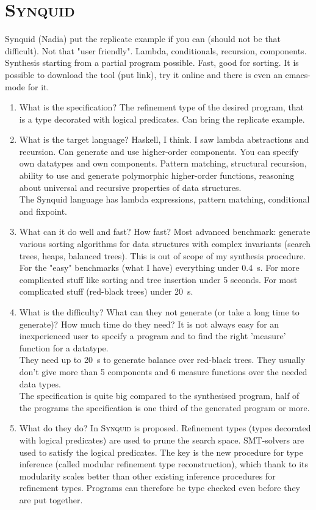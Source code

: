 \section{\textsc{Synquid}}
Synquid (Nadia) put the replicate example if you can (should not be that difficult). Not that "user friendly". Lambda, conditionals, recursion, components. Synthesis starting from a partial program possible. Fast, good for sorting. It is possible to download the tool (put link), try it online and there is even an emacs-mode for it.
\begin{enumerate}
\item What is the specification?
The refinement type of the desired program, that is a type decorated with logical predicates. Can bring the replicate example.
\item What is the target language?
Haskell, I think. I saw lambda abstractions and recursion. Can generate and use higher-order components. You can specify own datatypes and own components.
Pattern matching, structural recursion, ability to use and generate polymorphic higher-order functions, reasoning about universal and recursive properties of data structures.\\
The Synquid language has lambda expressions, pattern matching, conditional and fixpoint.
\item What can it do well and fast? How fast?
Most advanced benchmark: generate various sorting algorithms for data structures with complex invariants (search trees, heaps, balanced trees). This is out of scope of my synthesis procedure.
For the "easy" benchmarks (what I have) everything under 0.4~s. For more complicated stuff like sorting and tree insertion under 5 seconds. For most complicated stuff (red-black trees) under 20~s.
\item What is the difficulty? What can they not generate (or take a long time to generate)? How much time do they need?
It is not always easy for an inexperienced user to specify a program and to find the right 'measure' function for a datatype.\\
They need up to 20~s to generate balance over red-black trees. They usually don't give more than 5 components and 6 measure functions over the needed data types.\\
The specification is quite big compared to the synthesised program, half of the programs the specification is one third of the generated program or more.
\item What do they do?
In \cite{SynquidPaper} \textsc{Synquid} is proposed.
Refinement types (types decorated with logical predicates) are used to prune the search space. SMT-solvers are used to satisfy the logical predicates. The key is the new procedure for type inference (called modular refinement type reconstruction), which thank to its modularity scales better than other existing inference procedures for refinement types. Programs can therefore be type checked even before they are put together.
\end{enumerate}

